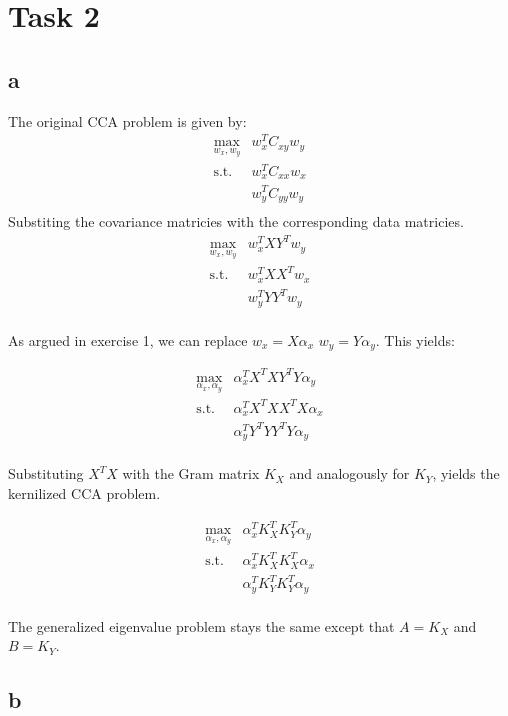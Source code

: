 \section*{Task 2}

\subsection*{a}
The original CCA problem is given by:
\begin{align}
    \max_{w_x, w_y} & w_x^T C_{xy} w_y \\
    \text{s.t. } & w_x^T C_{xx} w_x \\
                 & w_y^T C_{yy} w_y \\
\end{align}
Substiting the covariance matricies with the corresponding data matricies.
\begin{align}
    \max_{w_x, w_y} & w_x^T X Y^T w_y \\
    \text{s.t. } & w_x^T X X^T w_x \\
                 & w_y^T Y Y^T w_y \\
\end{align}

As argued in exercise 1, we can replace $w_x = X \alpha_x$
$w_y = Y \alpha_y$. This yields:

\begin{align}
    \max_{\alpha_x, \alpha_y} & \alpha_x^T X^T X Y^T Y \alpha_y \\
    \text{s.t. } & \alpha_x^T X^T X X^T X \alpha_x \\
                 & \alpha_y^T Y^T Y Y^T Y \alpha_y \\
\end{align}

Substituting $X^T X$ with the Gram matrix $K_X$ and analogously for $K_Y$,
yields the kernilized CCA problem.

\begin{align}
    \max_{\alpha_x, \alpha_y} & \alpha_x^T K_X^T K_Y^T \alpha_y \\
    \text{s.t. } & \alpha_x^T K_X^T K_X^T \alpha_x \\
                 & \alpha_y^T K_Y^T K_Y^T \alpha_y \\
\end{align}

The generalized eigenvalue problem stays the same except that $A = K_X$ and $B = K_Y$.

\subsection*{b}



